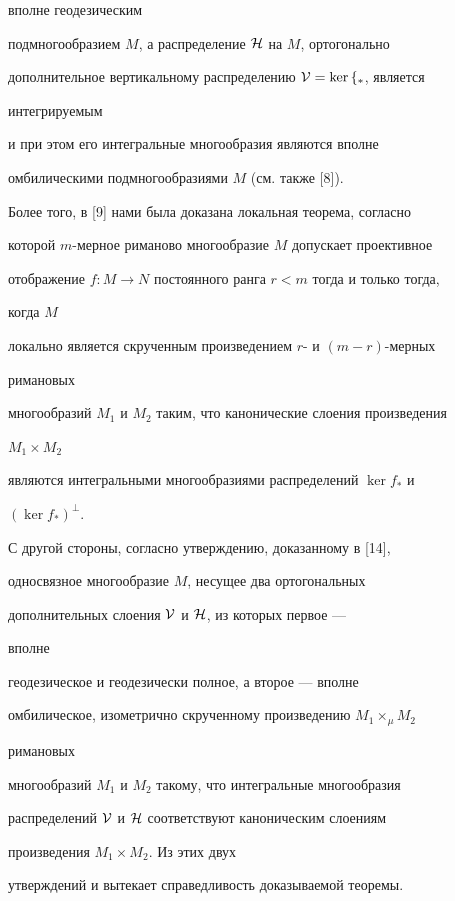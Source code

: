 вполне геодезическим 


подмногообразием $M$, а распределение $\cal H$ на $M$, ортогонально 


дополнительное вертикальному распределению $\cal V=\ker f_*$, является 


интегрируемым 


и при этом его интегральные многообразия являются вполне 


омбилическими подмногообразиями $M$ (см. также [8]). 


 


Более того, в [9] нами была доказана локальная теорема, согласно 


которой $m$-мерное риманово многообразие $M$ допускает проективное 


отображение $f:M\to N$ постоянного ранга $r<m$ тогда и только тогда, 


когда $M$ 


локально является скрученным произведением $r$- и $(m-r)$-мерных 


римановых 


многообразий $M_1$ и $M_2$ таким, что канонические слоения произведения 


$M_1\times M_2$ 


являются интегральными многообразиями распределений $\ker f_*$ и 


$(\ker f_*)^\bot$. 


 


С другой стороны, согласно утверждению, доказанному в [14], 


односвязное многообразие $M$, несущее два ортогональных 


дополнительных слоения $\cal V$ и $\cal H$, из которых первое --- 


вполне 


геодезическое и геодезически полное, а второе --- вполне 


омбилическое, изометрично скрученному произведению $M_1\times_\mu M_2$ 


римановых 


многообразий $M_1$ и $M_2$ такому, что интегральные многообразия 


распределений $\cal V$ и $\cal H$ соответствуют каноническим слоениям 


произведения $M_1\times M_2$. Из этих двух


утверждений и вытекает справедливость доказываемой теоремы. 


